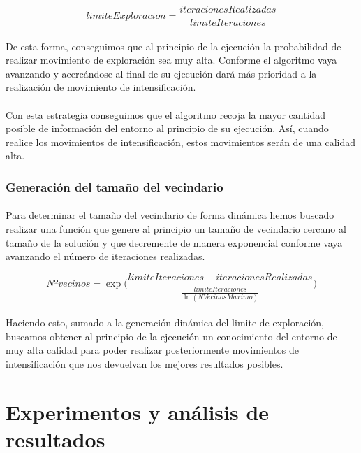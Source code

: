 \documentclass{article}
\begin{document}
	\[ limiteExploracion = \frac{iteracionesRealizadas}{limiteIteraciones}\]
	
	\paragraph{}De esta forma, conseguimos que al principio de la ejecución la probabilidad de realizar movimiento de exploración sea muy alta. Conforme el algoritmo vaya avanzando y acercándose al final de su ejecución dará más prioridad a la realización de movimiento de intensificación.
	
	\paragraph{}Con esta estrategia conseguimos que el algoritmo recoja la mayor cantidad posible de información del entorno al principio de su ejecución. Así, cuando realice los movimientos de intensificación, estos movimientos serán de una calidad alta.
	
	\subsubsection{Generación del tamaño del vecindario}
	
	\paragraph{}Para determinar el tamaño del vecindario de forma dinámica hemos buscado realizar una función que genere al principio un tamaño de vecindario cercano al tamaño de la solución y que decremente de manera exponencial conforme vaya avanzando el número de iteraciones realizadas.
	
	\[
	Nº vecinos = \exp\biggl( \frac{limiteIteraciones-iteracionesRealizadas}{\frac{limiteIteraciones}{\ln (NVecinosMaximo) }} \biggr)
	\]
	
	\paragraph{}Haciendo esto, sumado a la generación dinámica del limite de exploración, buscamos obtener al principio de la ejecución un conocimiento del entorno de muy alta calidad para poder realizar posteriormente movimientos de intensificación que nos devuelvan los mejores resultados posibles.
	
	\section{Experimentos y análisis de resultados}
	
\end{document}
